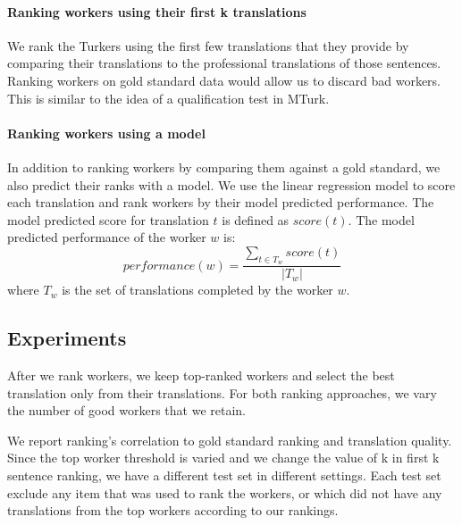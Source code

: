 \documentclass[11pt,letterpaper]{article}
\begin{document}

\paragraph{Ranking workers using their first k translations}
We rank the Turkers using the first few translations that they provide by comparing their translations to the professional translations of those sentences. Ranking workers on gold standard data would allow us to discard bad workers. This is similar to the idea of a qualification test in MTurk. 

\paragraph{Ranking workers using a model}
In addition to ranking workers by comparing them against a gold standard, we also predict their ranks with a model. 
We use the linear regression model to score each translation and rank workers by their model predicted performance.  
The model predicted score for translation $t$ is defined as $score(t)$. The model predicted performance of the worker $w$ is:
\begin{equation}
performance(w) = \frac{\sum_{t \in T_{w}} score (t)}{|T_{w}|}
\end{equation}
where $T_{w} $ is the set of translations completed by the worker $w$. 
 

\subsection{Experiments}

After we rank workers, we keep top-ranked workers and select the best translation only from their translations. For both ranking approaches, we vary the number of good workers that we retain. 

We report ranking's correlation to gold standard ranking and translation quality. Since the top worker threshold is varied and we change the value of k in first k sentence ranking, we have a different test set in different settings. Each test set exclude any item that was used to rank the workers, or which did not have any translations from the top workers according to our rankings. 
\end{document}
